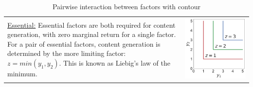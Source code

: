 \begin{table}[h!]
  \vspace{-0.5\baselineskip}
  \caption{Pairwise interaction between factors with contour}
  \vspace{-\baselineskip}
  \label{tab:interaction}
  \centering
  \begin{tabular}{m{}c}
	\vspace{-5pt}
    \uline{Essential:} Essential factors are both required for content generation, with zero marginal return for a single factor. For a pair of essential factors, content generation is determined by the more limiting factor: $z = min(y_1, y_2)$. This is known as Liebig's law of the minimum.
    &
    \begin{minipage}{.17\textwidth}
      \includegraphics[width=\textwidth, height=\textwidth]{Figures/Essential.pdf}
    \end{minipage}
    \\ 

\end{tabular}
\end{table}
